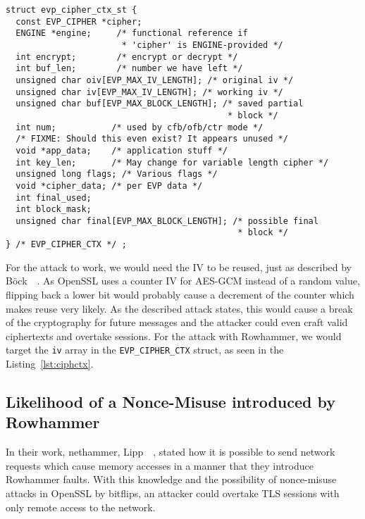 \begin{minipage}{\linewidth}
\begin{lstlisting}[style=CStyle,
                   caption={Context struct describing the Cipher used in TLS.
This struct is used as the SSL context inside OpenSSL. Source is taken from
OpenSSL version $1.1.0g$},
                   label={lst:ciphctx}]
struct evp_cipher_ctx_st {
  const EVP_CIPHER *cipher;
  ENGINE *engine;     /* functional reference if
                       * 'cipher' is ENGINE-provided */
  int encrypt;        /* encrypt or decrypt */
  int buf_len;        /* number we have left */
  unsigned char oiv[EVP_MAX_IV_LENGTH]; /* original iv */
  unsigned char iv[EVP_MAX_IV_LENGTH]; /* working iv */
  unsigned char buf[EVP_MAX_BLOCK_LENGTH]; /* saved partial
                                            * block */
  int num;           /* used by cfb/ofb/ctr mode */
  /* FIXME: Should this even exist? It appears unused */
  void *app_data;    /* application stuff */
  int key_len;       /* May change for variable length cipher */
  unsigned long flags; /* Various flags */
  void *cipher_data; /* per EVP data */
  int final_used;
  int block_mask;
  unsigned char final[EVP_MAX_BLOCK_LENGTH]; /* possible final
                                              * block */
} /* EVP_CIPHER_CTX */ ;
\end{lstlisting}
\end{minipage}

For the attack to work, we would need the IV to be reused, just as described by
Böck~\etal~\cite{gcmnonceattack}. As OpenSSL uses a counter IV for AES-GCM
instead of a random value, flipping back a lower bit would probably cause a
decrement of the counter which makes reuse very likely. As the described attack
states, this would cause a break of the cryptography for future messages and the
attacker could even craft valid ciphertexts and overtake sessions. For the
attack with Rowhammer, we would target the \texttt{iv} array in the
\texttt{EVP\_CIPHER\_CTX} struct, as seen in the Listing~\ref{lst:ciphctx}.

\subsection{Likelihood of a Nonce-Misuse introduced by Rowhammer}

In their work, nethammer, Lipp~\etal~\cite{nethammer}, stated how it is possible
to send network requests which cause memory accesses in a manner that they
introduce Rowhammer faults. With this knowledge and the possibility of
nonce-misuse attacks in OpenSSL by bitflips, an attacker could overtake TLS
sessions with only remote access to the network.

